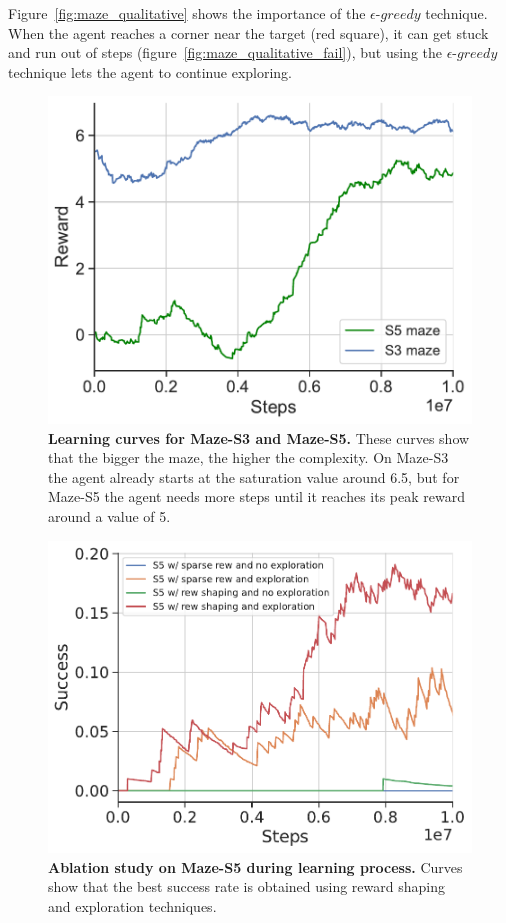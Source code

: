 Figure~\ref{fig:maze_qualitative} shows the importance of the $\epsilon\text{-}greedy$ technique.
When the agent reaches a corner near the target (red square), it can get stuck and run out of steps (figure~\ref{fig:maze_qualitative_fail}), but using the $\epsilon\text{-}greedy$ technique lets the agent to continue exploring.

\begin{figure}
    \centering
    \includegraphics[width=0.8\linewidth]{figures/understanding_vsn/S3_S5_reward}
    \caption{\textbf{Learning curves for Maze-S3 and Maze-S5.} These curves show that the bigger the maze, the higher the complexity. On Maze-S3 the agent already starts at the saturation value around 6.5, but for Maze-S5 the agent needs more steps until it reaches its peak reward around a value of 5.}
    \label{fig:reward-maze-results}
\end{figure}

\begin{figure}
    \centering
    \includegraphics[width=0.8\linewidth]{figures/understanding_vsn/S5_ablation_success}
    \caption{\textbf{Ablation study on Maze-S5 during learning process.} Curves show that the best success rate is obtained using reward shaping and exploration techniques.}
    \label{fig:ablation-maze-success}
\end{figure}

